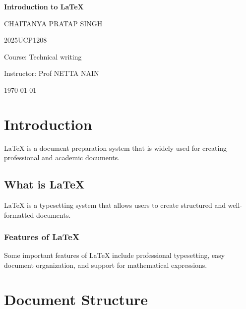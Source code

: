 \documentclass[12pt,a4paper]{report}
\begin{document}
\begin{titlepage}
    \centering
    {\Huge\bfseries Introduction to LaTeX\par}
    \vspace{2cm}
    {\Large CHAITANYA PRATAP SINGH\par}
    \vspace{0.5cm}
    2025UCP1208\par
    \vspace{1cm}
    Course: Technical writing\par
    \vspace{0.5cm}
    Instructor: Prof NETTA NAIN\par
    \vspace{1cm}
    \today
\end{titlepage}

\begin{abstract}
This document provides an introduction to LaTeX and demonstrates
how LaTeX can be used to create well-formatted documents.
It covers basic document structure, chapters, sections,
subsections, formatting, and page headers.
\end{abstract}

\chapter{Introduction}

LaTeX is a document preparation system that is widely used
for creating professional and academic documents.

\section{What is LaTeX}

LaTeX is a typesetting system that allows users to create
structured and well-formatted documents.

\subsection{Features of LaTeX}

Some important features of LaTeX include professional
typesetting, easy document organization, and support for
mathematical expressions.

\chapter{Document Structure}
\end{document}
